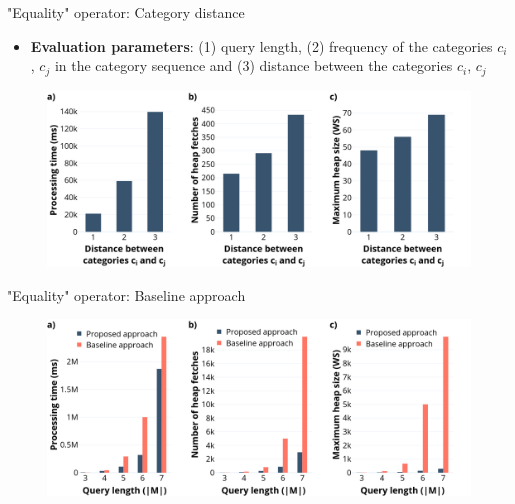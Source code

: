 \documentclass[18pt]{beamer}
\begin{document}
		\begin{frame}{"Equality" operator: Category distance}
		
			\begin{itemize}
				\item \textbf{Evaluation parameters}: (1) query length, (2) frequency of the categories $c_i$, $c_j$ in the category sequence and \textcolor{kit}{(3) distance between the categories $c_i$, $c_j$}
			\end{itemize}
			
			\begin{figure}[h]
				\includegraphics[scale=0.275]{eo_distance.png}
			\end{figure}
		
		\end{frame}
	
		\begin{frame}{"Equality" operator: Baseline approach}
			
			\begin{figure}[h]
				\includegraphics[scale=0.275]{eo2.png}
			\end{figure}
		
		\end{frame}
		
\end{document}
